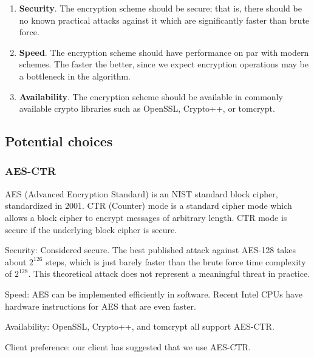 \begin{enumerate}
  \item \textbf{Security}.
  The encryption scheme should be secure; that is, there should be no known practical attacks against it which are significantly faster than brute force.

  \item \textbf{Speed}.
  The encryption scheme should have performance on par with modern schemes. The faster the better, since we expect encryption operations may be a bottleneck in the algorithm.

  \item \textbf{Availability}.
  The encryption scheme should be available in commonly available crypto libraries such as OpenSSL, Crypto++, or tomcrypt.

\end{enumerate}

\subsection{ Potential choices }
\subsubsection{ AES-CTR }

AES (Advanced Encryption Standard) is an NIST standard block cipher, standardized in 2001. CTR (Counter) mode is a standard cipher mode which allows a block cipher to encrypt messages of arbitrary length. CTR mode is secure if the underlying block cipher is secure.


Security: Considered secure. The best published attack against AES-128 takes about $2^{126}$ steps, which is just barely faster than the brute force time complexity of $2^{128}$. %
This theoretical attack does not represent a meaningful threat in practice.

Speed: AES can be implemented efficiently in software. %
Recent Intel CPUs have hardware instructions for AES that are even faster.

Availability: OpenSSL, Crypto++, and tomcrypt all support AES-CTR.

Client preference: our client has suggested that we use AES-CTR.

